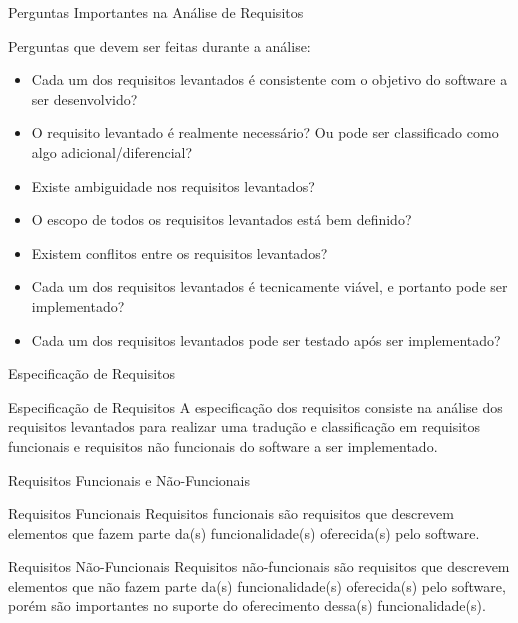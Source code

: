 \documentclass[xcolor=x11names,compress]{beamer}
\begin{document}
\begin{frame}[allowframebreaks=.8]{Perguntas Importantes na Análise de Requisitos}

Perguntas que devem ser feitas durante a análise:

\begin{itemize}
\itemsep 5mm

\item Cada um dos requisitos levantados é consistente com o objetivo do software a ser desenvolvido?

\item O requisito levantado é realmente necessário? Ou pode ser classificado como algo adicional/diferencial?

\item Existe ambiguidade nos requisitos levantados?

\item O escopo de todos os requisitos levantados está bem definido?

\item Existem conflitos entre os requisitos levantados?

\item Cada um dos requisitos levantados é tecnicamente viável, e portanto pode ser implementado?

\item Cada um dos requisitos levantados pode ser testado após ser implementado?

\end{itemize}

\end{frame}

\begin{frame}{Especificação de Requisitos}

\begin{alertblock}{Especificação de Requisitos}
A especificação dos requisitos consiste na análise dos requisitos levantados para realizar uma tradução e classificação em requisitos funcionais e requisitos não funcionais do software a ser implementado.
\end{alertblock}

\end{frame}

\begin{frame}{Requisitos Funcionais e Não-Funcionais}


\begin{alertblock}{Requisitos Funcionais}
Requisitos funcionais são requisitos que descrevem elementos que fazem parte da(s) funcionalidade(s) oferecida(s) pelo software.
\end{alertblock}

\begin{alertblock}{Requisitos Não-Funcionais}
Requisitos não-funcionais são requisitos que descrevem elementos que não fazem parte da(s) funcionalidade(s) oferecida(s) pelo software, porém são importantes no suporte do oferecimento dessa(s) funcionalidade(s). 
\end{alertblock}

\end{frame}
\end{document}
